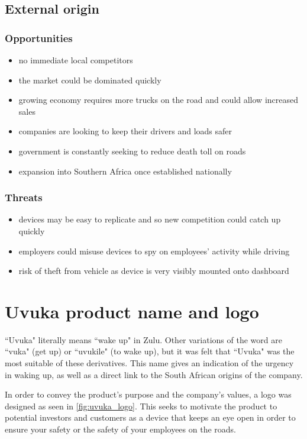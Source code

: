 \subsection{External origin}
\subsubsection{Opportunities}
\vskip8pt
\begin{itemize}
\item no immediate local competitors
\item the market could be dominated quickly
\item growing economy requires more trucks on the road and could allow increased sales
\item companies are looking to keep their drivers and loads safer
\item government is constantly seeking to reduce death toll on roads
\item expansion into Southern Africa once established nationally
\end{itemize}

\vskip15pt
\subsubsection{Threats}
\vskip8pt
\begin{itemize}
\item devices may be easy to replicate and so new competition could catch up quickly
\item employers could misuse devices to spy on employees' activity while driving
\item risk of theft from vehicle as device is very visibly mounted onto dashboard
\end{itemize}
\vskip15pt

\section{Uvuka product name and logo}
``Uvuka" literally means ``wake up" in Zulu. Other variations of the word are ``vuka" (get up) or ``uvukile" (to wake up), but it was felt that ``Uvuka" was the most suitable of these derivatives. This name gives an indication of the urgency in waking up, as well as a direct link to the South African origins of the company.

In order to convey the product's purpose and the company's values, a logo was designed as seen in \cref{fig:uvuka_logo}. This seeks to motivate the product to potential investors and customers as a device that keeps an eye open in order to ensure your safety or the safety of your employees on the roads.

